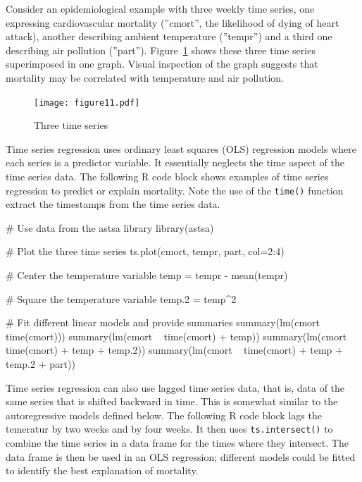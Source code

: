 Consider an epidemiological example with three weekly time series, one expressing cardiovascular mortality (''cmort'', the likelihood of dying of heart attack), another describing ambient temperature (''tempr'') and a third one describing air pollution (''part''). Figure~\ref{fig:figure11} shows these three time series superimposed in one graph. Visual inspection of the graph suggests that mortality may be correlated with temperature and air pollution.

\begin{figure}
\centering
\texttt{[image: figure11.pdf]}
\caption{Three time series}
\label{fig:figure11}
\end{figure}

Time series regression uses ordinary least squares (OLS) regression models where each series is a predictor variable. It essentially neglects the time aspect of the time series data. The following R code block shows examples of time series regression to predict or explain mortality. Note the use of the \texttt{time()} function extract the timestamps from the time series data.

\begin{samepage}
\begin{Rcode}
# Use data from the astsa library
library(astsa)

# Plot the three time series
ts.plot(cmort, tempr, part, col=2:4)

# Center the temperature variable
temp = tempr - mean(tempr)

# Square the temperature variable
temp.2 = temp^2

# Fit different linear models and provide summaries
summary(lm(cmort ~ time(cmort)))
summary(lm(cmort ~ time(cmort) + temp))
summary(lm(cmort ~ time(cmort) + temp + temp.2))
summary(lm(cmort ~ time(cmort) + temp + temp.2 + part))
\end{Rcode}
\end{samepage}

Time series regression can also use lagged time series data, that is, data of the same series that is shifted backward in time. This is somewhat similar to the autoregressive models defined below. The following R code block lags the temeratur by two weeks and by four weeks. It then uses \texttt{ts.intersect()} to combine the time series in a data frame for the times where they intersect. The data frame is then be used in an OLS regression; different models could be fitted to identify the best explanation of mortality.

